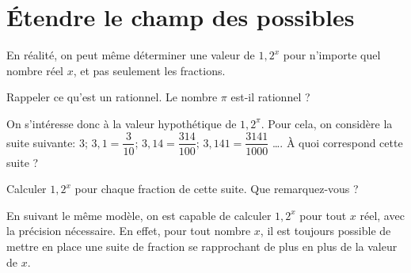 \documentclass{article}
\begin{document}
\section{Étendre le champ des possibles}
En réalité, on peut même déterminer une valeur de $1,2^x$ pour n'importe quel nombre réel $x$, et pas seulement les fractions.

\begin{enumquestions}
\item Rappeler ce qu'est un rationnel. Le nombre $\pi$ est-il rationnel ?
\item On s'intéresse donc à la valeur hypothétique de $1,2^{\pi}$. Pour cela, on considère la suite suivante: $3$; $3,1 = \dfrac{3}{10}$; $3,14 = \dfrac{314}{100}$; $3,141 = \dfrac{3141}{1000}$ \dots. À quoi correspond cette suite ?
\item Calculer $1,2^x$ pour chaque fraction de cette suite. Que remarquez-vous ?
\end{enumquestions}
\begin{tcolorbox}
En suivant le même modèle, on est capable de calculer $1,2^x$ pour tout $x$ réel, avec la précision nécessaire. En effet, pour tout nombre $x$, il est toujours possible de mettre en place une suite de fraction se rapprochant de plus en plus de la valeur de $x$.
\end{tcolorbox}
\end{document}
